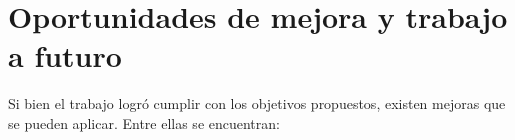 


\section{Oportunidades de mejora y trabajo a futuro}

Si bien el trabajo logró cumplir con los objetivos propuestos, existen mejoras que se pueden aplicar. Entre ellas se encuentran:

